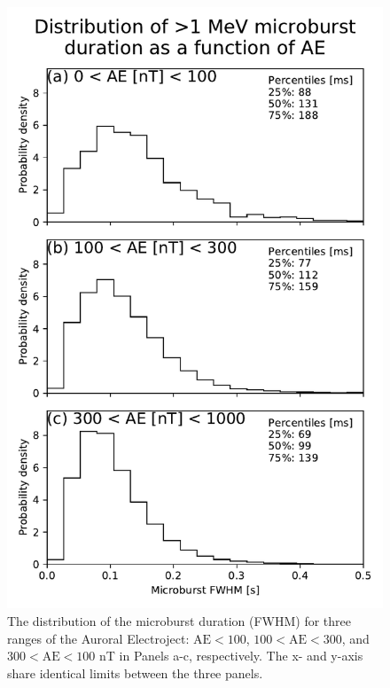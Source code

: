 \documentclass[draft]{agujournal2019}
\begin{document}
\begin{figure}
\noindent\includegraphics[width=\textwidth]{figures/fig4.pdf}
\caption{The distribution of the microburst duration (FWHM) for three ranges of the Auroral Electroject: $\mathrm{AE} < 100$, $100 < \mathrm{AE} < 300$, and $300 < \mathrm{AE} < 100$ nT in Panels a-c, respectively. The x- and y-axis share identical limits between the three panels.}
\label{fig4}
\end{figure}
\end{document}
